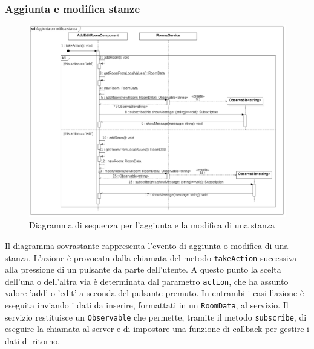 \subsubsection{Aggiunta e modifica stanze}
\begin{figure}[H]
	\centering
	\includegraphics[width=18cm]{res/images/webapp-addEditStanzePostazioni-diagrammaSequenza.png}
	\caption{Diagramma di sequenza per l'aggiunta e la modifica di una stanza}
	\label{fig:DiagrammaSequenzaStanzePostazioni2}
\end{figure}

Il diagramma sovrastante rappresenta l'evento di aggiunta o modifica di una stanza.
L'azione è provocata dalla chiamata del metodo \texttt{takeAction} successiva alla pressione di un pulsante da parte dell'utente. A questo punto la scelta dell'una o dell'altra via è determinata dal parametro \texttt{action}, che ha assunto valore 'add' o 'edit' a seconda del pulsante premuto. In entrambi i casi l'azione è eseguita inviando i dati da inserire, formattati in un \texttt{RoomData}, al servizio. Il servizio restituisce un \texttt{Observable} che permette, tramite il metodo \texttt{subscribe}, di eseguire la chiamata al server e di impostare una funzione di callback per gestire i dati di ritorno. 

